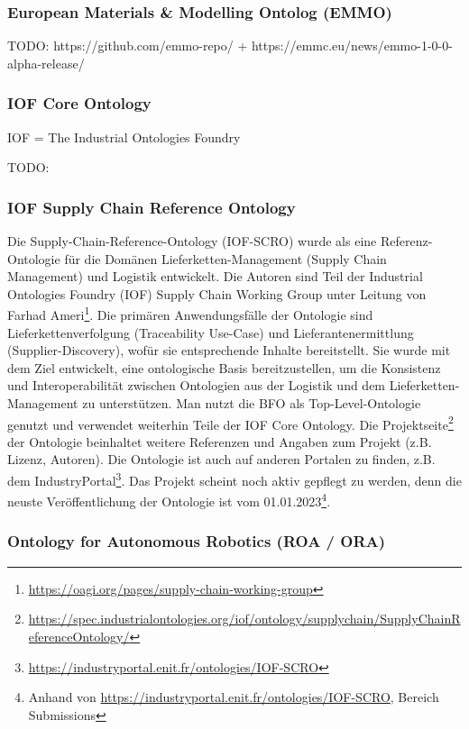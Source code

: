 \documentclass{article}
\begin{document}
\subsubsection{European Materials \& Modelling Ontolog (EMMO)}

TODO: https://github.com/emmo-repo/ + https://emmc.eu/news/emmo-1-0-0-alpha-release/

\subsubsection{IOF Core Ontology}

IOF = The Industrial Ontologies Foundry

TODO: \cite{kulvatunyou2022}

\subsubsection{IOF Supply Chain Reference Ontology}

Die Supply-Chain-Reference-Ontology (IOF-SCRO) wurde als eine Referenz-Ontologie für die Domänen Lieferketten-Management (Supply Chain Management) und Logistik entwickelt\cite{ameri2020towards}.
Die Autoren sind Teil der Industrial Ontologies Foundry (IOF) Supply Chain Working Group unter Leitung von Farhad Ameri\footnote{\url{https://oagi.org/pages/supply-chain-working-group}}.
Die primären Anwendungsfälle der Ontologie sind Lieferkettenverfolgung (Traceability Use-Case) und Lieferantenermittlung (Supplier-Discovery), wofür sie entsprechende Inhalte bereitstellt.
Sie wurde mit dem Ziel entwickelt, eine ontologische Basis bereitzustellen, um die Konsistenz und Interoperabilität zwischen Ontologien aus der Logistik und dem Lieferketten-Management zu unterstützen.
Man nutzt die BFO als Top-Level-Ontologie genutzt und verwendet weiterhin Teile der IOF Core Ontology\cite{Kulvatunyou2022}.
Die Projektseite\footnote{\url{https://spec.industrialontologies.org/iof/ontology/supplychain/SupplyChainReferenceOntology/}} der Ontologie beinhaltet weitere Referenzen und Angaben zum Projekt (z.B. Lizenz, Autoren).
Die Ontologie ist auch auf anderen Portalen zu finden, z.B. dem IndustryPortal\footnote{\url{https://industryportal.enit.fr/ontologies/IOF-SCRO}}.
Das Projekt scheint noch aktiv gepflegt zu werden, denn die neuste Veröffentlichung der Ontologie ist vom 01.01.2023\footnote{Anhand von \url{https://industryportal.enit.fr/ontologies/IOF-SCRO}, Bereich Submissions}.

\subsubsection{Ontology for Autonomous Robotics (ROA / ORA)}
\end{document}
